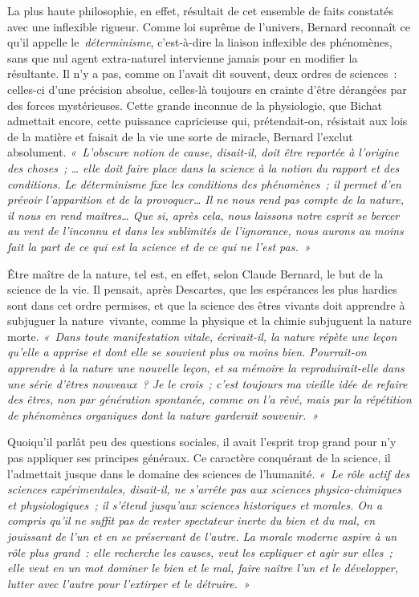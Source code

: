 \documentclass[french,twoside]{book} %
\newcommand\persName[1]{#1}
\begin{document}
La plus haute philosophie, en effet, résultait de cet ensemble de faits constatés avec une inflexible rigueur. Comme loi suprême de l’univers, {\persName Bernard} reconnaît ce qu’il appelle le {\itshape déterminisme}, c’est-à-dire la liaison inflexible des phénomènes, sans que nul agent extra-naturel intervienne jamais pour en modifier la résultante. Il n’y a pas, comme on l’avait dit souvent, deux ordres de sciences : celles-ci d’une précision absolue, celles-là toujours en crainte d’être dérangées par des forces mystérieuses. Cette grande inconnue de la physiologie, que {\persName Bichat} admettait encore, cette puissance capricieuse qui, prétendait-on, résistait aux lois de la matière et faisait de la vie une sorte de miracle, {\persName Bernard} l’exclut absolument. \emph{« L’obscure notion de cause, disait-il, doit être reportée à l’origine des choses ; … elle doit faire place dans la science à la notion du rapport et des conditions. Le déterminisme fixe les conditions des phénomènes ; il permet d’en prévoir l’apparition et de la provoquer… Il ne nous rend pas compte de la nature, il nous en rend maîtres… Que si, après cela, nous laissons notre esprit se bercer au vent de l’inconnu et dans les sublimités de l’ignorance, nous aurons au moins fait la part de ce qui est la science et de ce qui ne l’est pas. »}\par
Être maître de la nature, tel est, en effet, selon {\persName Claude Bernard}, le but de la science de la vie. Il pensait, après {\persName Descartes}, que les espérances les plus hardies sont dans cet ordre permises, et que la science des êtres vivants doit apprendre à subjuguer la nature vivante, comme la physique et la chimie subjuguent la nature morte. \emph{« Dans toute manifestation vitale, écrivait-il, la nature répète une leçon qu’elle a apprise et dont elle se souvient plus ou moins bien. Pourrait-on apprendre à la nature une nouvelle leçon, et sa mémoire la reproduirait-elle dans une série d’êtres nouveaux ? Je le crois ; c’est toujours ma vieille idée de refaire des êtres, non par génération spontanée, comme on l’a rêvé, mais par la répétition de phénomènes organiques dont la nature garderait souvenir. »}\par
Quoiqu’il parlât peu des questions sociales, il avait l’esprit trop grand pour n’y pas appliquer ses principes généraux. Ce caractère conquérant de la science, il l’admettait jusque dans le domaine des sciences de l’humanité. \emph{« Le rôle actif des sciences expérimentales, disait-il, ne s’arrête pas aux sciences physico-chimiques et physiologiques ; il s’étend jusqu’aux sciences historiques et morales. On a compris qu’il ne suffit pas de rester spectateur inerte du bien et du mal, en jouissant de l’un et en se préservant de l’autre. La morale moderne aspire à un rôle plus grand : elle recherche les causes, veut les expliquer et agir sur elles ; elle veut en un mot dominer le bien et le mal, faire naître l’un et le développer, lutter avec l’autre pour l’extirper et le détruire. »}\par
\end{document}
